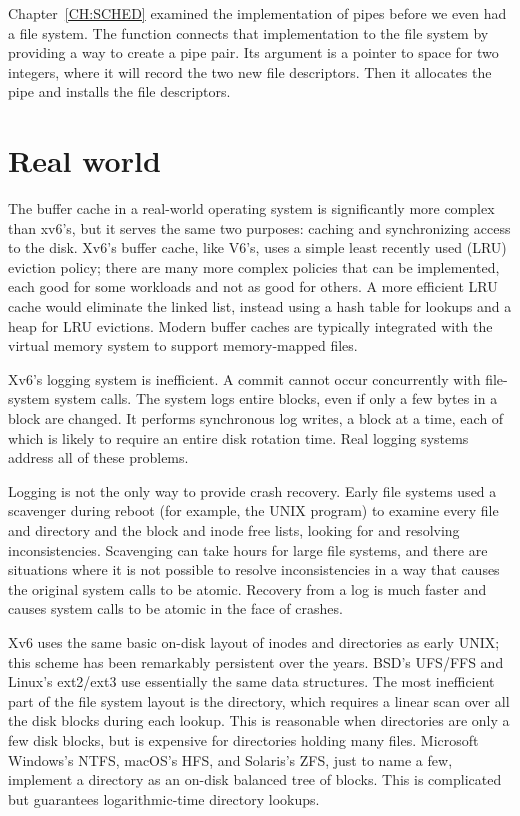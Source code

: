 Chapter~\ref{CH:SCHED} examined the implementation of pipes
before we even had a file system.
The function
connects that implementation to the file system
by providing a way to create a pipe pair.
Its argument is a pointer to space for two integers,
where it will record the two new file descriptors.
Then it allocates the pipe and installs the file descriptors.
\section{Real world}

The buffer cache in a real-world operating system is significantly
more complex than xv6's, but it serves the same two purposes:
caching and synchronizing access to the disk.
Xv6's buffer cache, like V6's, uses a simple least recently used (LRU)
eviction policy; there are many more complex
policies that can be implemented, each good for some
workloads and not as good for others.
A more efficient LRU cache would eliminate the linked list,
instead using a hash table for lookups and a heap for LRU evictions.
Modern buffer caches are typically integrated with the
virtual memory system to support memory-mapped files.

Xv6's logging system is inefficient.
A commit cannot occur concurrently with file-system system calls.
The system logs entire blocks, even if
only a few bytes in a block are changed. It performs synchronous
log writes, a block at a time, each of which is likely to require an
entire disk rotation time. Real logging systems address all of these
problems.

Logging is not the only way to provide crash recovery. Early file systems
used a scavenger during reboot (for example, the UNIX
program) to examine every file and directory and the block and inode
free lists, looking for and resolving inconsistencies. Scavenging can take
hours for large file systems, and there are situations where it is not
possible to resolve inconsistencies in a way that causes the original
system calls to be atomic. Recovery
from a log is much faster and causes system calls to be atomic
in the face of crashes.

Xv6 uses the same basic on-disk layout of inodes and directories
as early UNIX;
this scheme has been remarkably persistent over the years.
BSD's UFS/FFS and Linux's ext2/ext3 use essentially the same data structures.
The most inefficient part of the file system layout is the directory,
which requires a linear scan over all the disk blocks during each lookup.
This is reasonable when directories are only a few disk blocks,
but is expensive for directories holding many files.
Microsoft Windows's NTFS, macOS's HFS, and Solaris's ZFS, just to name a few, implement
a directory as an on-disk balanced tree of blocks.
This is complicated but guarantees logarithmic-time directory lookups.

